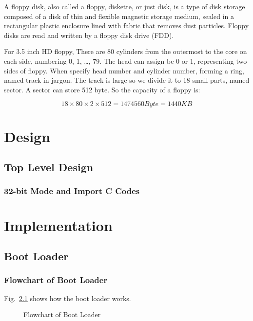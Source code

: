 \documentclass{swfcthesis}
\begin{document}
A floppy disk, also called a floppy, diskette, or just disk, is a type of disk storage
composed of a disk of thin and flexible magnetic storage medium, sealed in a rectangular
plastic enclosure lined with fabric that removes dust particles. Floppy disks are read and
written by a floppy disk drive (FDD)\cite{wiki:floppy}.

For 3.5 inch HD floppy,  There are 80 cylinders from the outermost to
the core on each side, numbering 0, 1, \ldots, 79. The head can assign be 0 or 1,
representing two sides of floppy. When specify head number and cylinder number, forming a
ring, named track in jargon. The track is large so we divide it to 18 small parts, named
sector. A sector can store 512 byte. So the capacity of a floppy is:

\[18 \times 80 \times 2 \times 512 = 1474560 Byte = 1440 KB\]


\chapter{Design}

\section{Top Level Design}


\subsection{32-bit Mode and Import C Codes}

\chapter{Implementation}

\section{Boot Loader}

\subsection{Flowchart of Boot Loader}

Fig.~\ref{fig:flowchart-of-boot-loader} shows how the boot loader works.

\begin{figure}[!ht]
  \centering
  \caption{Flowchart of Boot Loader}\label{fig:flowchart-of-boot-loader}  
\end{figure}
\end{document}
